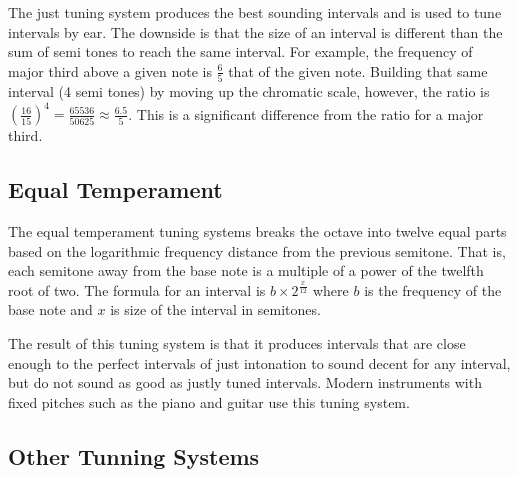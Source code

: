 The just tuning system produces the best sounding intervals and is used to tune intervals by ear.
The downside is that the size of an interval is different than the sum of semi tones to reach the same interval.
For example, the frequency of major third above a given note is $\frac{6}{5}$ that of the given note.
Building that same interval (4 semi tones) by moving up the chromatic scale, however, the ratio is $(\frac{16}{15})^{4} = \frac{65536}{50625} \approx \frac{6.5}{5}$.
This is a significant difference from the ratio for a major third.

\subsection{Equal Temperament} \label{mathinmusic:intervals:equal}

The equal temperament tuning systems breaks the octave into twelve equal parts based on the logarithmic frequency distance from the previous semitone.
That is, each semitone away from the base note is a multiple of a power of the twelfth root of two.
The formula for an interval is $b \times 2^{\frac{x}{12}}$ where $b$ is the frequency of the base note and $x$ is size of the interval in semitones.

The result of this tuning system is that it produces intervals that are close enough to the perfect intervals of just intonation to sound decent for any interval, but do not sound as good as justly tuned intervals.
Modern instruments with fixed pitches such as the piano and guitar use this tuning system.

\subsection{Other Tunning Systems} \label{mathinmusic:intervals:othertuning}



